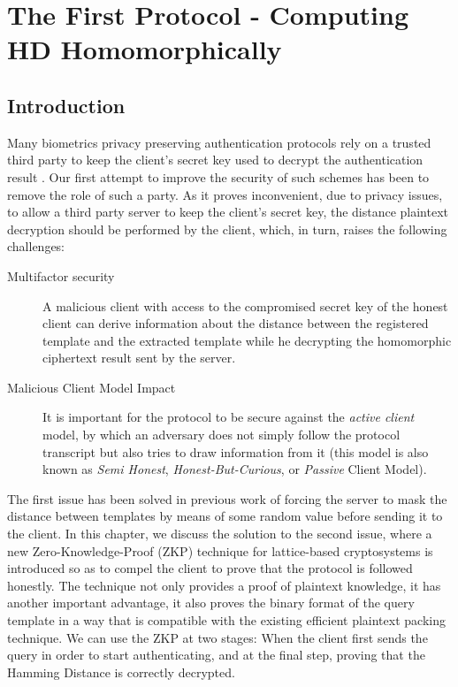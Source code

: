 \chapter{The First Protocol - Computing HD Homomorphically}
\label{chap:firstProtocol}

\ifpdf
    \graphicspath{{Chapter3/Figs/Raster/}{Chapter3/Figs/PDF/}{Chapter3/Figs/}}
\else
    \graphicspath{{Chapter3/Figs/Vector/}{Chapter3/Figs/}}
\fi

\section{Introduction}
\label{sec:firstProcIntro}
Many biometrics privacy preserving authentication protocols rely on a trusted
third party to keep the client's secret key used to decrypt the authentication
result \cite{mandal2015comprehensive, hirano2013cryptographically, upmanyu2010blind}. Our first attempt to improve the security of such schemes has
been to remove the role of such a party. As it proves inconvenient, due to
privacy issues, to allow a third party server to keep the client's secret key, the
distance plaintext decryption should be performed by the client, which, in turn,
raises the following challenges:
\begin{description}
\item[Multifactor security] A malicious client with access to the compromised
  secret key of the honest client can derive information about the distance
  between the registered template and the extracted template while he decrypting
  the homomorphic ciphertext result sent by the server.
\item[Malicious Client Model Impact] It is important for the protocol to be secure
  against the \textit{active client }model, by which an adversary does not simply follow the
  protocol transcript but also tries to draw information from it (this model is also known
  as \textit{Semi Honest}, \textit{Honest-But-Curious}, or \textit{Passive} Client Model). 
\end{description}

The first issue has been solved in previous work of
\cite{mandal2015comprehensive} forcing the server to mask the distance between
templates by means of some random value before sending it to the client. In this
chapter, we discuss the solution to the second issue, where a new
Zero-Knowledge-Proof (ZKP) technique for lattice-based cryptosystems is
introduced so as to compel the client to prove that the protocol is followed
honestly. The technique not only provides a proof of plaintext knowledge, it has
another important advantage, it also proves the binary format of the query
template in a way that is compatible with the existing efficient plaintext
packing technique. We can use the ZKP at two stages: When the
client first sends the query in order to start authenticating, and at the final
step, proving that the Hamming Distance is correctly decrypted.


